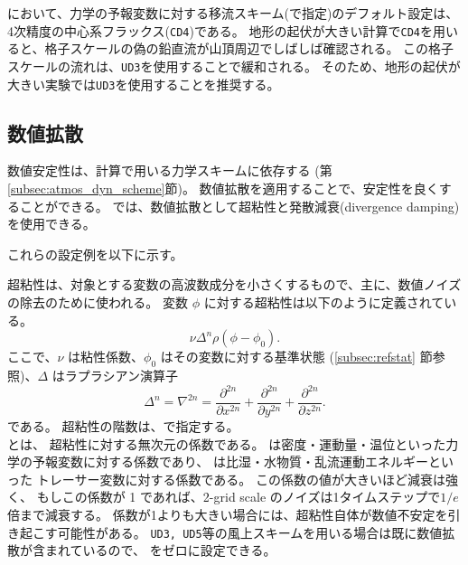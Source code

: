 \scalerm において、力学の予報変数に対する移流スキーム(で指定)のデフォルト設定は、
4次精度の中心系フラックス(\verb|CD4|)である。
地形の起伏が大きい計算で\verb|CD4|を用いると、格子スケールの偽の鉛直流が山頂周辺でしばしば確認される。
この格子スケールの流れは、\verb|UD3|を使用することで緩和される。
そのため、地形の起伏が大きい実験では\verb|UD3|を使用することを推奨する。

\subsection{数値拡散} \label{subsec:numdiff}

数値安定性は、計算で用いる力学スキームに依存する (第\ref{subsec:atmos_dyn_scheme}節)。
数値拡散を適用することで、安定性を良くすることができる。
\scalerm では、数値拡散として超粘性と発散減衰(divergence damping)を使用できる。

これらの設定例を以下に示す。

超粘性は、対象とする変数の高波数成分を小さくするもので、主に、数値ノイズの除去のために使われる。
変数 $\phi$ に対する超粘性は以下のように定義されている。
\begin{equation}
  \nu \Delta^n \rho ( \phi - \phi_0 ).
\end{equation}
ここで、$\nu$ は粘性係数、$\phi_0$ はその変数に対する基準状態 (\ref{subsec:refstat} 節参照)、$\Delta$ はラプラシアン演算子
\begin{equation}
  \Delta^n = \nabla^{2n} = \frac{\partial^{2n}}{\partial x^{2n}} + \frac{\partial^{2n}}{\partial y^{2n}} + \frac{\partial^{2n}}{\partial z^{2n}}.
\end{equation}
である。
超粘性の階数は、で指定する。\\
とは、
超粘性に対する無次元の係数である。
は密度・運動量・温位といった力学の予報変数に対する係数であり、
は比湿・水物質・乱流運動エネルギーといった
トレーサー変数に対する係数である。
この係数の値が大きいほど減衰は強く、
もしこの係数が 1 であれば、2-grid scale のノイズは1タイムステップで$1/e$倍まで減衰する。
係数が1よりも大きい場合には、超粘性自体が数値不安定を引き起こす可能性がある。
\verb|UD3, UD5|等の風上スキームを用いる場合は既に数値拡散が含まれているので、
をゼロに設定できる。

